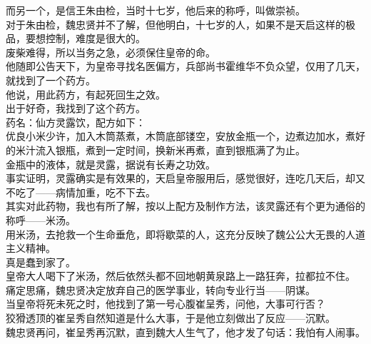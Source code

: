 \begin{multicols}{\theparacolNo}
而另一个，是信王朱由检，当时十七岁，他后来的称呼，叫做崇祯。\\

对于朱由检，魏忠贤并不了解，但他明白，十七岁的人，如果不是天启这样的极品，要想控制，难度是很大的。\\

废柴难得，所以当务之急，必须保住皇帝的命。\\

他随即公告天下，为皇帝寻找名医偏方，兵部尚书霍维华不负众望，仅用了几天，就找到了一个药方。\\

他说，用此药方，有起死回生之效。\\

出于好奇，我找到了这个药方。\\

药名：仙方灵露饮，配方如下：\\

优良小米少许，加入木筒蒸煮，木筒底部镂空，安放金瓶一个，边煮边加水，煮好的米汁流入银瓶，煮到一定时间，换新米再煮，直到银瓶满了为止。\\

金瓶中的液体，就是灵露，据说有长寿之功效。\\

事实证明，灵露确实是有效果的，天启皇帝服用后，感觉很好，连吃几天后，却又不吃了——病情加重，吃不下去。\\

其实对此药物，我也有所了解，按以上配方及制作方法，该灵露还有个更为通俗的称呼——米汤。\\

用米汤，去抢救一个生命垂危，即将歇菜的人，这充分反映了魏公公大无畏的人道主义精神。\\

真是蠢到家了。\\

皇帝大人喝下了米汤，然后依然头都不回地朝黄泉路上一路狂奔，拉都拉不住。\\

痛定思痛，魏忠贤决定放弃自己的医学事业，转向专业行当——阴谋。\\

当皇帝将死未死之时，他找到了第一号心腹崔呈秀，问他，大事可行否？\\

狡猾透顶的崔呈秀自然知道是什么大事，于是他立刻做出了反应——沉默。\\

魏忠贤再问，崔呈秀再沉默，直到魏大人生气了，他才发了句话：我怕有人闹事。\\


\end{multicols}
